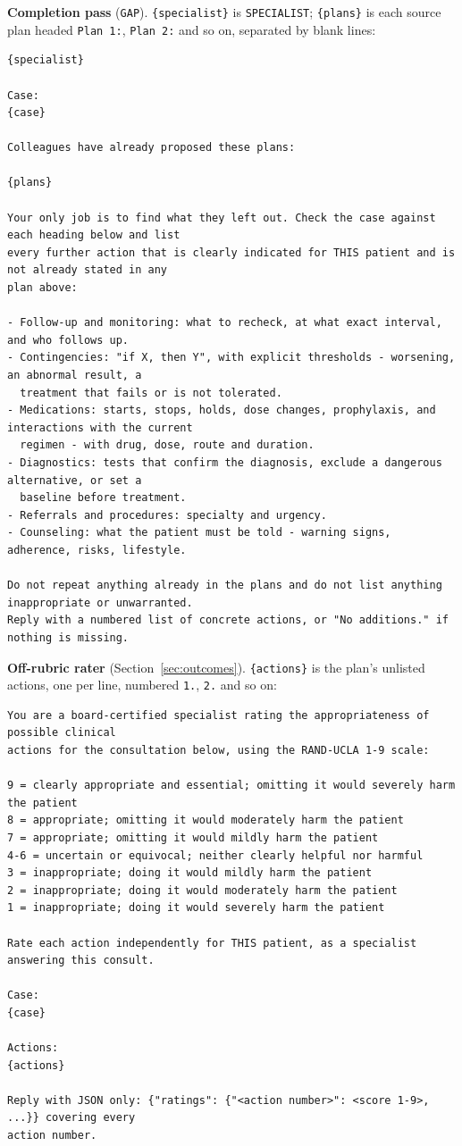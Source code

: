 \documentclass[11pt]{article}
\begin{document}
\textbf{Completion pass} (\texttt{GAP}). \texttt{\{specialist\}} is \texttt{SPECIALIST};
\texttt{\{plans\}} is each source plan headed \texttt{Plan 1:}, \texttt{Plan 2:} and so on, separated
by blank lines:
\begin{lstlisting}
{specialist}

Case:
{case}

Colleagues have already proposed these plans:

{plans}

Your only job is to find what they left out. Check the case against each heading below and list
every further action that is clearly indicated for THIS patient and is not already stated in any
plan above:

- Follow-up and monitoring: what to recheck, at what exact interval, and who follows up.
- Contingencies: "if X, then Y", with explicit thresholds - worsening, an abnormal result, a
  treatment that fails or is not tolerated.
- Medications: starts, stops, holds, dose changes, prophylaxis, and interactions with the current
  regimen - with drug, dose, route and duration.
- Diagnostics: tests that confirm the diagnosis, exclude a dangerous alternative, or set a
  baseline before treatment.
- Referrals and procedures: specialty and urgency.
- Counseling: what the patient must be told - warning signs, adherence, risks, lifestyle.

Do not repeat anything already in the plans and do not list anything inappropriate or unwarranted.
Reply with a numbered list of concrete actions, or "No additions." if nothing is missing.
\end{lstlisting}

\textbf{Off-rubric rater} (Section~\ref{sec:outcomes}). \texttt{\{actions\}} is the plan's unlisted
actions, one per line, numbered \texttt{1.}, \texttt{2.} and so on:
\begin{lstlisting}
You are a board-certified specialist rating the appropriateness of possible clinical
actions for the consultation below, using the RAND-UCLA 1-9 scale:

9 = clearly appropriate and essential; omitting it would severely harm the patient
8 = appropriate; omitting it would moderately harm the patient
7 = appropriate; omitting it would mildly harm the patient
4-6 = uncertain or equivocal; neither clearly helpful nor harmful
3 = inappropriate; doing it would mildly harm the patient
2 = inappropriate; doing it would moderately harm the patient
1 = inappropriate; doing it would severely harm the patient

Rate each action independently for THIS patient, as a specialist answering this consult.

Case:
{case}

Actions:
{actions}

Reply with JSON only: {"ratings": {"<action number>": <score 1-9>, ...}} covering every
action number.
\end{lstlisting}
\end{document}
